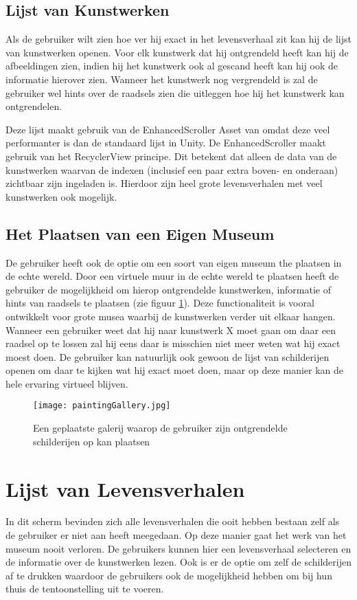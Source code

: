 \subsection{Lijst van Kunstwerken}
Als de gebruiker wilt zien hoe ver hij exact in het levensverhaal zit kan hij de lijst van kunstwerken openen. Voor elk kunstwerk dat hij ontgrendeld heeft kan hij de afbeeldingen zien, indien hij het kunstwerk ook al gescand heeft kan hij ook de informatie hierover zien. Wanneer het kunstwerk nog vergrendeld is zal de gebruiker wel hints over de raadsels zien die uitleggen hoe hij het kunstwerk kan ontgrendelen.

Deze lijst maakt gebruik van de EnhancedScroller Asset van \textcite{EchoScroller} omdat deze veel performanter is dan de standaard lijst in Unity. De EnhancedScroller maakt gebruik van het RecyclerView principe. Dit betekent dat alleen de data van de kunstwerken waarvan de indexen (inclusief een paar extra boven- en onderaan) zichtbaar zijn ingeladen is. Hierdoor zijn heel grote levensverhalen met veel kunstwerken ook mogelijk.

\subsection{Het Plaatsen van een Eigen Museum}
De gebruiker heeft ook de optie om een soort van eigen museum the plaatsen in de echte wereld. Door een virtuele muur in de echte wereld te plaatsen heeft de gebruiker de mogelijkheid om hierop ontgrendelde kunstwerken, informatie of hints van raadsels te plaatsen (zie figuur \ref{fig:paintingGallery}). Deze functionaliteit is vooral ontwikkelt voor grote musea waarbij de kunstwerken verder uit elkaar hangen. Wanneer een gebruiker weet dat hij naar kunstwerk X moet gaan om daar een raadsel op te lossen zal hij eens daar is misschien niet meer weten wat hij exact moest doen. De gebruiker kan natuurlijk ook gewoon de lijst van schilderijen openen om daar te kijken wat hij exact moet doen, maar op deze manier kan de hele ervaring virtueel blijven.

\begin{figure}
    \centering
    \texttt{[image: paintingGallery.jpg]}
    \caption{Een geplaatste galerij waarop de gebruiker zijn ontgrendelde schilderijen op kan plaatsen}
    \label{fig:paintingGallery}
\end{figure}

\section{Lijst van Levensverhalen}
In dit scherm bevinden zich alle levensverhalen die ooit hebben bestaan zelf als de gebruiker er niet aan heeft meegedaan. Op deze manier gaat het werk van het museum nooit verloren. De gebruikers kunnen hier een levensverhaal selecteren en de informatie over de kunstwerken lezen. Ook is er de optie om zelf de schilderijen af te drukken waardoor de gebruikers ook de mogelijkheid hebben om bij hun thuis de tentoonstelling uit te voeren.